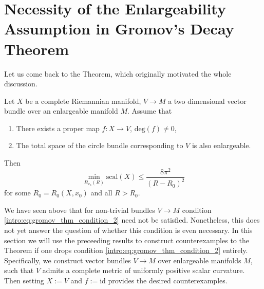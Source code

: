 \section{Necessity of the Enlargeability Assumption in Gromov's Decay Theorem}

Let us come back to the Theorem, which originally motivated the whole discussion. 

\begin{theorem*}
    \label{intro:thm:gromov_thm}
Let $X$ be a complete Riemannian manifold, $V \to M$ a two dimensional vector bundle over an enlargeable manifold $M$. Assume that 
\begin{enumerate}[label=(\roman*)]
    \item There exists a proper map $f \colon X \to V$, $\mathrm{deg}(f) \neq 0$,
    \item \label{intro:eq:gromov_thm_condition_2}The total space of the circle bundle corresponding to $V$ is also enlargeable.
\end{enumerate}
Then 
\[
\min_{B_{x_0}(R)} \mathrm{scal}(X) \leq \frac{8 \pi^2}{(R-R_0)^2}
\]
for some $R_0 = R_0(X,x_0)$ and all $R > R_0$.
\end{theorem*}

We have seen above that for non-trivial bundles $V \to M$ condition \ref{intro:eq:gromov_thm_condition_2} need not be satisfied. Nonetheless, this does not yet answer the question of whether this condition is even necessary. In this section we will use the preceeding results to construct counterexamples to the Theorem if one drops condition \ref{intro:eq:gromov_thm_condition_2} entirely. Specifically, we construct vector bundles $V \to M$ over enlargeable manifolds $M$, such that $V$ admits a complete metric of uniformly positive scalar curvature. Then setting $X := V$ and $f := \mathrm{id}$ provides the desired counterexamples.

